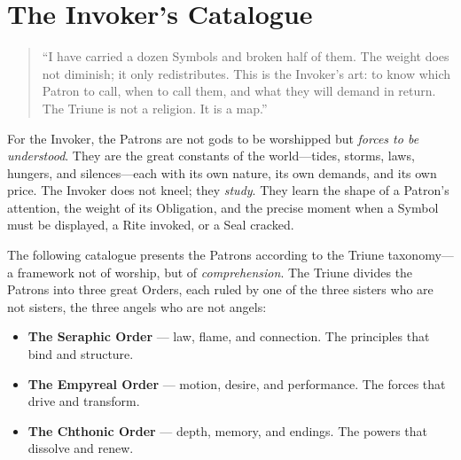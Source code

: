%
%
%


\section*{The Invoker's Catalogue}

\begin{quote}
``I have carried a dozen Symbols and broken half of them. The weight does not diminish; it only redistributes. This is the Invoker's art: to know which Patron to call, when to call them, and what they will demand in return. The Triune is not a religion. It is a map.''
\end{quote}

\noindent
For the Invoker, the Patrons are not gods to be worshipped but \emph{forces to be understood}. They are the great constants of the world---tides, storms, laws, hungers, and silences---each with its own nature, its own demands, and its own price. The Invoker does not kneel; they \emph{study}. They learn the shape of a Patron's attention, the weight of its Obligation, and the precise moment when a Symbol must be displayed, a Rite invoked, or a Seal cracked.

The following catalogue presents the Patrons according to the Triune taxonomy---a framework not of worship, but of \emph{comprehension}. The Triune divides the Patrons into three great Orders, each ruled by one of the three sisters who are not sisters, the three angels who are not angels:

\begin{itemize}[leftmargin=1.5em]
  \item \textbf{The Seraphic Order} --- law, flame, and connection. The principles that bind and structure.
  \item \textbf{The Empyreal Order} --- motion, desire, and performance. The forces that drive and transform.
  \item \textbf{The Chthonic Order} --- depth, memory, and endings. The powers that dissolve and renew.
\end{itemize}

